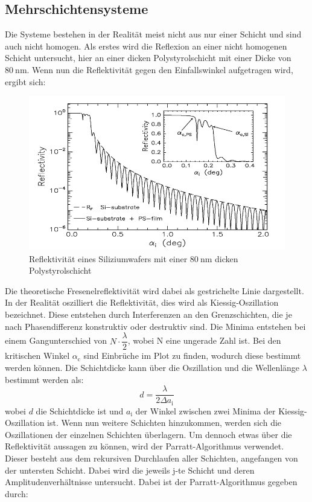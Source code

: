 \subsection{Mehrschichtensysteme}
\label{sec:Mehrschichtensysteme}
Die Systeme bestehen in der Realität meist nicht aus nur einer Schicht und sind auch nicht homogen. Als erstes wird die Reflexion an einer nicht homogenen Schicht untersucht, hier an einer  dicken Polystyrolschicht mit einer Dicke von $\SI{80}{\nano\meter}$. Wenn nun die Reflektivität gegen den Einfallswinkel aufgetragen wird, ergibt sich:
\begin{figure}[h!]
  \label{fig:kiessig}
  \centering
  \includegraphics[scale=0.4]{fig/kiessing.png}
  \caption{Reflektivität eines Siliziumwafers mit einer $\SI{80}{\nano\meter}$ dicken Polystyrolschicht \cite[8]{Anleitung3}}
\end{figure}
\FloatBarrier
\noindent Die theoretische Fresenelreflektivität wird dabei als gestrichelte Linie dargestellt. In der Realität oszilliert die Reflektivität, dies wird als Kiessig-Oszillation bezeichnet. Diese entstehen durch Interferenzen an den Grenzschichten, die je nach Phasendifferenz konstruktiv oder destruktiv sind. Die Minima entstehen bei einem Gangunterschied von $N\cdot\dfrac{\lambda}{2}$, wobei N eine ungerade Zahl ist. Bei den kritischen Winkel $\alpha_\mathrm{c}$ sind Einbrüche im Plot zu finden, wodurch diese bestimmt werden können. Die Schichtdicke kann über die Oszillation und die Wellenlänge $\lambda$ bestimmt werden als:
\begin{equation}
  \label{eqn:Schichtdicke}
d = \dfrac{\lambda}{2\Delta a_\mathrm{i}}
\end{equation}
wobei $d$ die Schichtdicke ist und  $a_\mathrm{i}$ der Winkel zwischen zwei Minima der Kiessig-Oszillation ist.
Wenn nun weitere Schichten hinzukommen, werden sich die Oszillationen der einzelnen Schichten überlagern. Um dennoch etwas über die Reflektivität aussagen zu können, wird der Parratt-Algorithmus verwendet. Dieser besteht aus dem rekursiven Durchlaufen aller Schichten, angefangen von der untersten Schicht. Dabei wird die jeweils j-te Schicht und deren Amplitudenverhältnisse untersucht. Dabei ist der Parratt-Algorithmus gegeben durch:
